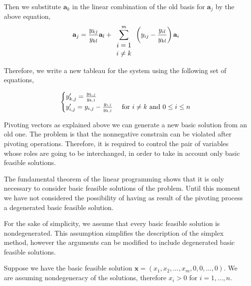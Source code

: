 Then we substitute $\mathbf{a}_{k}$ in the linear combination of the old basis for $\mathbf{a}_j$ by the above equation,
\begin{equation*}
	\mathbf{a}_j =\frac{y_{kj}}{y_{kl}}\mathbf{a}_l+\sum_{\begin{array}{c}
			i=1 \\ i\neq k
		\end{array}}^{m}\left( y_{ij}-\frac{y_{il}}{y_{kl}} \right)\mathbf{a}_i
\end{equation*} 

Therefore, we write a new tableau for the system using the following set of equations,

\begin{equation}
	\begin{cases}
	y'_{k,j}= \frac{y_{k,j}}{y_{k,l}} & \\
	y'_{i,j}= y_{i,j}-\frac{y_{i,l}}{y_{k,l}} &  \text{ for }i\neq k \ \mathrm{and} \ 0\leq i\leq n 
	\end{cases}
\end{equation}


Pivoting vectors as explained above we can generate a new basic solution from an old one. The problem is that the nonnegative constrain can be violated after pivoting operations. Therefore, it is required to control the pair of variables whose roles are going to be interchanged, in order to take in account only basic feasible solutions.

The fundamental theorem of the linear programming shows that it is only necessary to consider basic feasible solutions of the problem. Until this moment we have not considered the possibility of having as result of the pivoting process a degenerated basic feasible solution. 

For the sake of simplicity, we assume that every basic feasible solution is nondegenerated. This assumption simplifies the description of the simplex method, however the arguments can be modified to include degenerated basic feasible solutions.

Suppose we have the basic feasible solution $\mathbf{x}=\left(x_1, x_2, \dots, x_m, 0,0, \dots, 0\right)$. We are assuming nondegeneracy of the solutions, therefore $x_i>0$ for $i=1,\dots, n$. 

